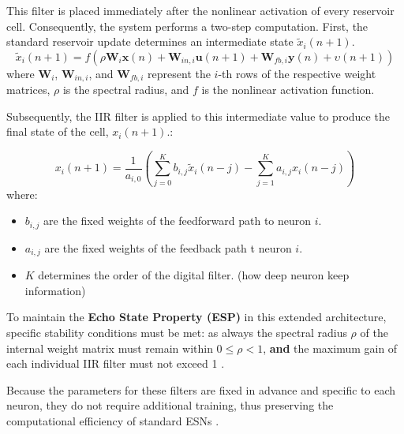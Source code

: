 \vspace{0.5cm}

This filter is placed immediately after the nonlinear activation of every reservoir cell. Consequently, the system performs a two-step computation. First, the standard reservoir update determines an intermediate state $\tilde{x}_i(n+1)$. 
\begin{equation}
    \tilde{x}_i(n+1) = f \left( \rho \mathbf{W}_i \mathbf{x}(n) + \mathbf{W}_{in,i} \mathbf{u}(n+1) + \mathbf{W}_{fb,i} \mathbf{y}(n) + \upsilon(n+1) \right)
\end{equation}
where $\mathbf{W}_i$, $\mathbf{W}_{in,i}$, and $\mathbf{W}_{fb,i}$ represent the $i$-th rows of the respective weight matrices, $\rho$ is the spectral radius, and $f$ is the nonlinear activation function.

Subsequently, the IIR filter is applied to this intermediate value to produce the final state of the cell, $x_i(n+1)$.\cite{holzmann2010echo}:

\begin{equation}
    x_i(n+1) = \frac{1}{a_{i,0}} \left( \sum_{j=0}^K b_{i,j} \tilde{x}_i(n-j) - \sum_{j=1}^K a_{i,j} x_i(n-j) \right)
\end{equation}
where:
\begin{itemize}
    \item $b_{i,j}$ are the fixed weights of the feedforward path to neuron $i$.
    \item $a_{i,j}$ are the fixed weights of the feedback path t neuron $i$.
    \item $K$ determines the order of the digital filter. (how deep neuron keep information)
\end{itemize}

\vspace{0.5cm}

To maintain the \textbf{Echo State Property (ESP)} in this extended architecture, specific stability conditions must be met: as always the spectral radius $\rho$ of the internal weight matrix must remain within $0\leq\rho<1$, \textbf{and} the maximum gain of each individual IIR filter must not exceed 1 \cite{holzmann2010echo}.

\vspace{0.5cm}

Because the parameters for these filters are fixed in advance and specific to each neuron, they do not require additional training, thus preserving the computational efficiency of standard ESNs \cite{holzmann2010echo}.

